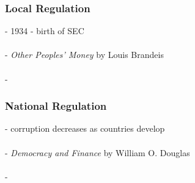 \documentclass{article} %
\begin{document}
			\subsubsection*{Local Regulation}
			- 1934 - birth of SEC \\ \\
			- \textit{Other Peoples' Money} by Louis Brandeis \\ \\
			- 
	
			\subsubsection*{National Regulation}
			- corruption decreases as countries develop \\ \\ 
			- \textit{Democracy and Finance} by William O. Douglas \\ \\
			- 
			
			
			
				     		
\end{document}
